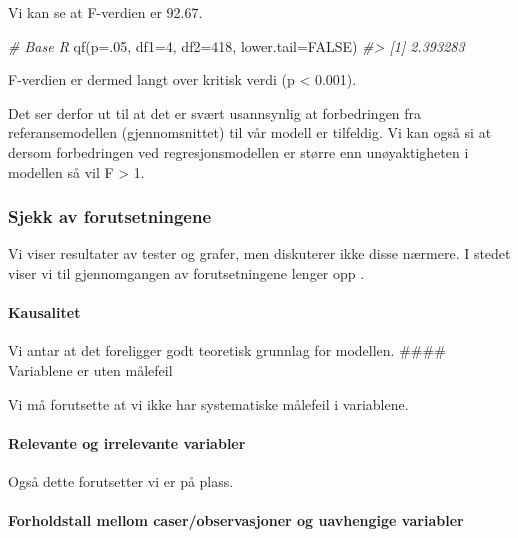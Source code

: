 \documentclass[
]{article}
\newenvironment{Shaded}{\begin{snugshade}}{\end{snugshade}}
\newcommand{\AttributeTok}[1]{\textcolor[rgb]{0.77,0.63,0.00}{#1}}
\newcommand{\CommentTok}[1]{\textcolor[rgb]{0.56,0.35,0.01}{\textit{#1}}}
\newcommand{\ConstantTok}[1]{\textcolor[rgb]{0.00,0.00,0.00}{#1}}
\newcommand{\DecValTok}[1]{\textcolor[rgb]{0.00,0.00,0.81}{#1}}
\newcommand{\FunctionTok}[1]{\textcolor[rgb]{0.00,0.00,0.00}{#1}}
\newcommand{\NormalTok}[1]{#1}
\begin{document}
Vi kan se at F-verdien er 92.67.

\begin{Shaded}
\begin{Highlighting}[]
\CommentTok{\# Base R}
\FunctionTok{qf}\NormalTok{(}\AttributeTok{p=}\NormalTok{.}\DecValTok{05}\NormalTok{, }\AttributeTok{df1=}\DecValTok{4}\NormalTok{, }\AttributeTok{df2=}\DecValTok{418}\NormalTok{, }\AttributeTok{lower.tail=}\ConstantTok{FALSE}\NormalTok{)}
\CommentTok{\#\textgreater{} [1] 2.393283}
\end{Highlighting}
\end{Shaded}

F-verdien er dermed langt over kritisk verdi (p \textless{} 0.001).

Det ser derfor ut til at det er svært usannsynlig at forbedringen fra referansemodellen (gjennomsnittet) til vår modell er tilfeldig. Vi kan også si at dersom forbedringen ved regresjonsmodellen er større enn unøyaktigheten i modellen så vil F \textgreater{} 1.

\hypertarget{sjekk-av-forutsetningene-1}{%
\subsubsection{Sjekk av forutsetningene}\label{sjekk-av-forutsetningene-1}}

Vi viser resultater av tester og grafer, men diskuterer ikke disse nærmere. I stedet viser vi til gjennomgangen av forutsetningene lenger opp .

\hypertarget{kausalitet-2}{%
\paragraph{Kausalitet}\label{kausalitet-2}}

Vi antar at det foreligger godt teoretisk grunnlag for modellen.
\#\#\#\# Variablene er uten målefeil

Vi må forutsette at vi ikke har systematiske målefeil i variablene.

\hypertarget{relevante-og-irrelevante-variabler-2}{%
\paragraph{Relevante og irrelevante variabler}\label{relevante-og-irrelevante-variabler-2}}

Også dette forutsetter vi er på plass.

\hypertarget{forholdstall-mellom-caserobservasjoner-og-uavhengige-variabler-2}{%
\paragraph{Forholdstall mellom caser/observasjoner og uavhengige variabler}\label{forholdstall-mellom-caserobservasjoner-og-uavhengige-variabler-2}}
\end{document}
